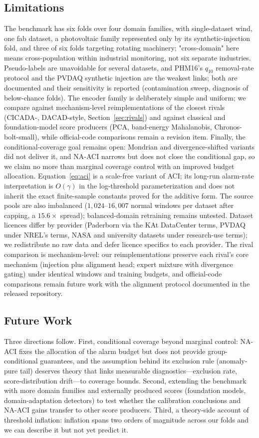 \subsection{Limitations}
The benchmark has six folds over four domain families, with single-dataset wind, one fab dataset, a photovoltaic family represented only by its synthetic-injection fold, and three of six folds targeting rotating machinery; "cross-domain" here means cross-population within industrial monitoring, not six separate industries. Pseudo-labels are unavoidable for several datasets, and PHM16's $q_{10}$ removal-rate protocol and the PVDAQ synthetic injection are the weakest links; both are documented and their sensitivity is reported (contamination sweep, diagnosis of below-chance folds). The encoder family is deliberately simple and uniform; we compare against mechanism-level reimplementations of the closest rivals (CICADA-, DACAD-style, Section~\ref{sec:rivals}) and against classical and foundation-model score producers (PCA, band-energy Mahalanobis, Chronos-bolt-small), while official-code comparisons remain a revision item. Finally, the conditional-coverage goal remains open: Mondrian and divergence-shifted variants did not deliver it, and NA-ACI narrows but does not close the conditional gap, so we claim no more than marginal coverage control with an improved budget allocation. Equation~\ref{eq:aci} is a scale-free variant of ACI; its long-run alarm-rate interpretation is $O(\gamma)$ in the log-threshold parameterization and does not inherit the exact finite-sample constants proved for the additive form. The source pools are also imbalanced ($1{,}024$--$16{,}007$ normal windows per dataset after capping, a $15.6\times$ spread); balanced-domain retraining remains untested. Dataset licences differ by provider (Paderborn via the KAt DataCenter terms, PVDAQ under NREL's terms, NASA and university datasets under research-use terms); we redistribute no raw data and defer licence specifics to each provider. The rival comparison is mechanism-level: our reimplementations preserve each rival's core mechanism (injection plus alignment head; expert mixture with divergence gating) under identical windows and training budgets, and official-code comparisons remain future work with the alignment protocol documented in the released repository.

\subsection{Future Work}
Three directions follow. First, conditional coverage beyond marginal control: NA-ACI fixes the allocation of the alarm budget but does not provide group-conditional guarantees, and the assumption behind its exclusion rule (anomaly-pure tail) deserves theory that links measurable diagnostics---exclusion rate, score-distribution drift---to coverage bounds. Second, extending the benchmark with more domain families and externally produced scores (foundation models, domain-adaptation detectors) to test whether the calibration conclusions and NA-ACI gains transfer to other score producers. Third, a theory-side account of threshold inflation: inflation spans two orders of magnitude across our folds and we can describe it but not yet predict it.
